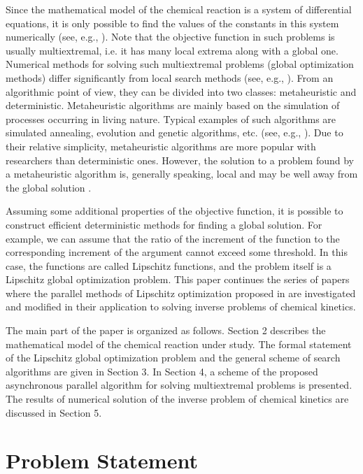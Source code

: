 \documentclass{svproc}
\begin{document}
Since the mathematical model of the chemical reaction is a system of differential equations, it is only possible to find the values of the constants in this system numerically (see, e.g., \cite{RSD}). Note that the objective function in such problems is usually multiextremal, i.e. it has many local extrema along with a global one.
Numerical methods for solving such multiextremal problems (global optimization methods) differ significantly from local search methods (see, e.g., \cite{Sergeyev2017, PaulaviciusZilinskas2014}). From an algorithmic point of view, they can be divided into two classes: metaheuristic and deterministic. Metaheuristic algorithms are mainly based on the simulation of processes occurring in living nature. Typical examples of such algorithms are simulated annealing, evolution and genetic algorithms, etc. (see, e.g., \cite{Battiti2009,Eiben2015}).     Due to their relative simplicity, metaheuristic algorithms are more popular with researchers than deterministic ones.  However, the solution to a problem found by a metaheuristic algorithm is, generally speaking, local and may be well away from the global solution \cite{Kvasov2018}.

Assuming some additional properties of the objective function, it is possible to construct efficient deterministic methods for finding a global solution. For example, we can assume that the ratio of the increment of the function to the corresponding increment of the argument cannot exceed some threshold. In this case, the functions are called Lipschitz functions, and the problem itself is a Lipschitz global optimization problem.
This paper continues the series of papers where the parallel methods of Lipschitz optimization proposed in \cite{Strongin2000} are investigated and modified in their application to solving inverse problems of chemical kinetics.

The main part of the paper is organized as follows. Section 2 describes the mathematical model of the chemical reaction under study. The formal statement of the Lipschitz global optimization problem and the general scheme of search algorithms are given in Section 3. In Section 4, a scheme of the proposed asynchronous parallel algorithm for solving multiextremal problems is presented. The results of numerical solution of the inverse problem of chemical kinetics are discussed in Section 5.


\section{Problem Statement}\label{Sec_math_mod}
\end{document}
